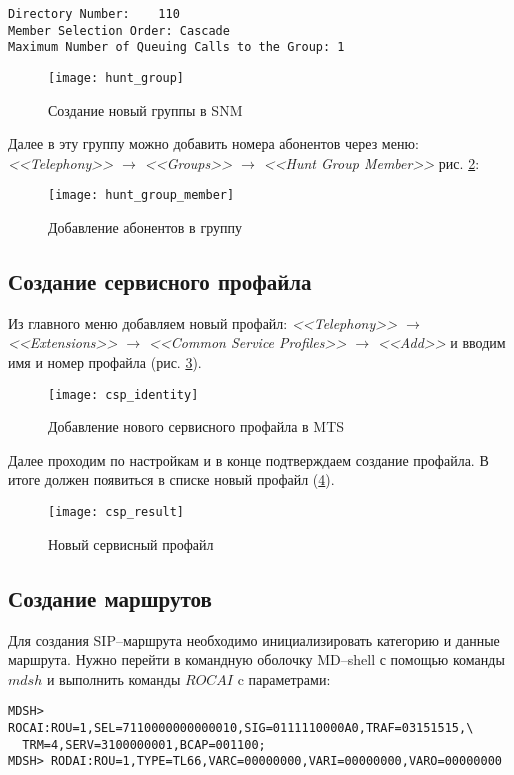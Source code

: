 \begin{lstlisting}
Directory Number:    110
Member Selection Order: Cascade
Maximum Number of Queuing Calls to the Group: 1
\end{lstlisting}

\begin{figure}[!ht]
  \center
  \texttt{[image: hunt\_group]}
  \caption{Создание новый группы в SNM}
  \label{img:hunt_group}
\end{figure}

Далее в эту группу можно добавить номера абонентов через меню: {\em <<Telephony>>  $\rightarrow$ <<Groups>> $\rightarrow$ <<Hunt Group Member>>} рис. \ref{img:hunt_group_member}:

\begin{figure}[!ht]
  \center
  \texttt{[image: hunt\_group\_member]}
  \caption{Добавление абонентов в группу}
  \label{img:hunt_group_member}
\end{figure}
\clearpage

\subsection{Создание сервисного профайла} \label{subsec:csp}

Из главного меню добавляем новый профайл: {\em <<Telephony>> $\rightarrow$ <<Extensions>> $\rightarrow$ <<Common Service Profiles>> $\rightarrow$ <<Add>>} и вводим имя и номер профайла (рис. \ref{img:csp_identity}).
\begin{figure}[!ht]
  \center
  \texttt{[image: csp\_identity]}
  \caption{Добавление нового сервисного профайла в MTS}
  \label{img:csp_identity}
\end{figure}

Далее проходим по настройкам и в конце подтверждаем создание профайла. В итоге должен появиться в списке новый профайл (\ref{img:csp_result}).
\begin{figure}[!ht]
  \center
  \texttt{[image: csp\_result]}
  \caption{Новый сервисный профайл}
  \label{img:csp_result}
\end{figure}
\clearpage

\subsection{Создание маршрутов}

Для создания SIP--маршрута необходимо инициализировать категорию и данные маршрута. Нужно перейти в командную оболочку MD--shell с помощью команды $mdsh$ и выполнить команды $ROCAI$ c параметрами:
\begin{lstlisting}
MDSH> ROCAI:ROU=1,SEL=7110000000000010,SIG=0111110000A0,TRAF=03151515,\
  TRM=4,SERV=3100000001,BCAP=001100;
MDSH> RODAI:ROU=1,TYPE=TL66,VARC=00000000,VARI=00000000,VARO=00000000
\end{lstlisting}

